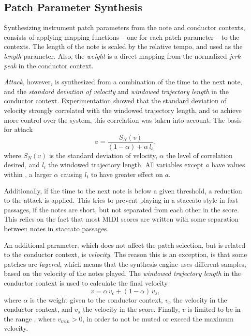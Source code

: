 \subsection{Patch Parameter Synthesis}

Synthesizing instrument patch parameters
from the note and conductor contexts,
consists of applying mapping functions --
one for each patch parameter --
to the contexts.
The length of the note is
scaled by the relative tempo,
and used as the \textit{length} parameter.
Also, the \textit{weight} is a direct mapping
from the normalized \textit{jerk peak}
in the conductor context.

\textit{Attack}, however,
is synthesized from a combination
of the time to the next note,
and the \textit{standard deviation of velocity}
and \textit{windowed trajectory length}
in the conductor context.
Experimentation showed that
the standard deviation of velocity
strongly correlated with
the windowed trajectory length,
and to achieve more control over the system,
this correlation was taken into account:
The basis for attack
\begin{equation}
a = \frac{S_N(v)}{(1 - \alpha) + \alpha \, l_t},
\end{equation}
where $S_N(v)$ is the standard deviation of velocity,
$\alpha$ the level of correlation desired,
and $l_t$ the windowed trajectory length.
All variables except $a$
have values within ,
a larger $\alpha$ causing $l_t$ to have
greater effect on $a$.

Additionally, if the time to the next note is below a given threshold,
a reduction to the attack is applied.
This tries to prevent playing in a staccato style in fast passages,
if the notes are short, but not separated from each other in the score.
This relies on the fact that most MIDI scores are written
with some separation between notes in staccato passages.

An additional parameter, which does not affect the patch selection,
but is related to the conductor context,
is \textit{velocity}.
The reason this is an exception,
is that some patches are \textit{layered},
which means that the synthesis engine
uses different samples,
based on the velocity of the notes played.
The \textit{windowed trajectory length} in the conductor context
is used to calculate the final velocity
\begin{equation}
v = \alpha \, v_c + (1 - \alpha) \, v_s,
\label{eq:veclocity_construction}
\end{equation}
where $\alpha$ is the weight given to the conductor context,
$v_c$ the velocity in the conductor context,
and $v_s$ the velocity in the score.
Finally, $v$ is limited to be in the range
, where $v_{min} > 0$,
in order to not be muted or exceed the maximum velocity.

